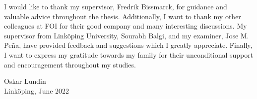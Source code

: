 
I would like to thank my supervisor, Fredrik Bissmarck, for guidance and valuable advice throughout the thesis.
Additionally, I want to thank my other colleagues at FOI for their good company and many interesting discussions.
My supervisor from Linköping University, Sourabh Balgi, and my examiner, Jose M. Peña, have provided feedback and suggestions which I greatly appreciate. 
Finally, I want to express my gratitude towards my family for their unconditional support and encouragement throughout my studies.

\begin{flushright}
    Oskar Lundin\\
    Linköping, June 2022
\end{flushright}
